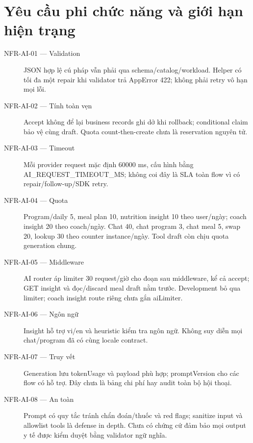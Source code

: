 \documentclass[12pt,a4paper]{article}
\begin{document}
\section{Yêu cầu phi chức năng và giới hạn hiện trạng}
\begin{description}
  \item[NFR-AI-01 --- Validation] JSON hợp lệ cú pháp vẫn phải qua schema/catalog/workload. Helper có tối đa một repair khi validator trả AppError 422; không phải retry vô hạn mọi lỗi.
  \item[NFR-AI-02 --- Tính toàn vẹn] Accept không để lại business records ghi dở khi rollback; conditional claim bảo vệ cùng draft. Quota count-then-create chưa là reservation nguyên tử.
  \item[NFR-AI-03 --- Timeout] Mỗi provider request mặc định 60000 ms, cấu hình bằng AI\_REQUEST\_TIMEOUT\_MS; không coi đây là SLA toàn flow vì có repair/follow-up/SDK retry.
  \item[NFR-AI-04 --- Quota] Program/daily 5, meal plan 10, nutrition insight 10 theo user/ngày; coach insight 20 theo coach/ngày. Chat 40, chat program 3, chat meal 5, swap 20, lookup 30 theo counter instance/ngày. Tool draft còn chịu quota generation chung.
  \item[NFR-AI-05 --- Middleware] AI router áp limiter 30 request/giờ cho đoạn sau middleware, kể cả accept; GET insight và đọc/discard meal draft nằm trước. Development bỏ qua limiter; coach insight route riêng chưa gắn aiLimiter.
  \item[NFR-AI-06 --- Ngôn ngữ] Insight hỗ trợ vi/en và heuristic kiểm tra ngôn ngữ. Không suy diễn mọi chat/program đã có cùng locale contract.
  \item[NFR-AI-07 --- Truy vết] Generation lưu tokenUsage và payload phù hợp; promptVersion cho các flow có hỗ trợ. Đây chưa là bảng chi phí hay audit toàn bộ hội thoại.
  \item[NFR-AI-08 --- An toàn] Prompt có quy tắc tránh chẩn đoán/thuốc và red flags; sanitize input và allowlist tools là defense in depth. Chưa có chứng cứ đảm bảo mọi output y tế được kiểm duyệt bằng validator ngữ nghĩa.
\end{description}
\end{document}
